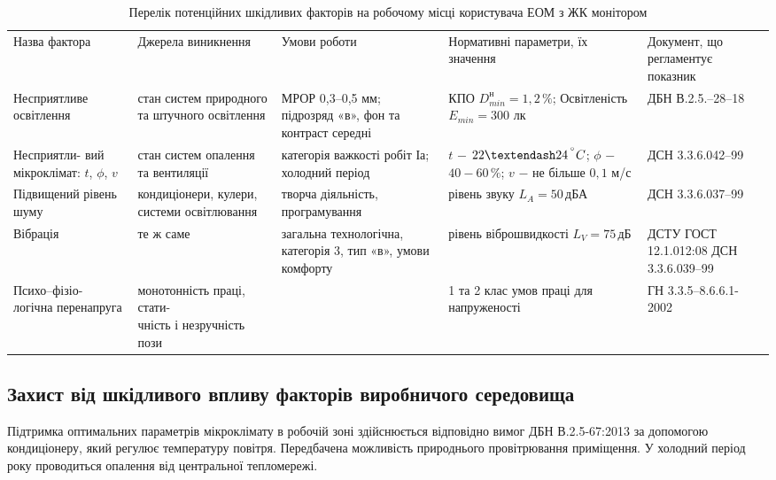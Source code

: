 \begin{table}[hbt!]
	\captionstyle{ \raggedright}
	\caption{Перелік потенційних шкідливих факторів на робочому місці користувача ЕОМ з ЖК монітором}\label{tab:work2-2}
	\begin{tabular}{|m{}|m{}|m{}|m{}|m{}|}
		\hline
		Назва фактора& Джерела виникнення& Умови роботи& Нормативні параметри, їх значення & Документ, що регламентує показник \\
		\hlinewd{2pt}
		Несприятливе освітлення & стан систем природного та штучного освітлення & МРОР 0,3–0,5 мм; підрозряд «в», фон та контраст середні & КПО $D^{н}_{min} = 1,2 \, \%$; Освітленість $E_{min} = 300$ лк & ДБН В.2.5.–28–18 \\
		\hline
		\parbox[t]{0.18\textwidth}{Несприятли-\\вий мікроклімат: $t$, $\phi$, $v$} & стан систем опалення та вентиляції & категорія важкості робіт Іа; холодний період & $t$ $-$ $22–24 \, ^{\degree}C$; $\phi$ $-$ $40-60 \, \%$; $v$ $-$ не більше $0,1$ м/с & ДСН 3.3.6.042–99 \\
		\hline
		Підвищений рівень шуму & кондиціонери, кулери, системи освітлювання & творча діяльність, програмування & рівень звуку $L_{A} = 50 \, \text{дБА}$ & ДСН 3.3.6.037–99 \\
		\hline
		Вібрація & те ж саме & загальна технологічна, категорія 3, тип «в», умови комфорту & рівень віброшвидкості $L_{V} = 75 \, \text{дБ}$ & ДСТУ ГОСТ 12.1.012:08 ДСН 3.3.6.039–99 \\
		\hline
		\parbox[t]{0.18\textwidth}{Психо–фізіо-\\логічна перенапруга} & \parbox[t]{0.2\textwidth}{монотонність праці, стати-\\чність і незручність пози} & & 1 та 2 клас умов праці для напруженості & \parbox[t]{0.165\textwidth}{ГН 3.3.5–8.6.6.1-\\2002} \\
		\hline
	\end{tabular}
\end{table}

\newpage

\subsection{Захист від шкідливого впливу факторів виробничого середовища}

Підтримка оптимальних параметрів мікроклімату в робочій зоні здійснюється відповідно вимог ДБН В.2.5-67:2013 за допомогою кондиціонеру, який регулює температуру повітря. Передбачена можливість природнього провітрювання приміщення. У холодний період року проводиться опалення від центральної тепломережі.


